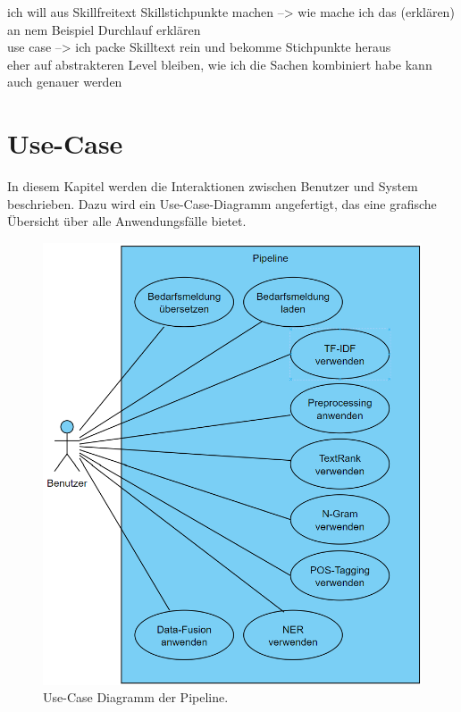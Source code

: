 ich will aus Skillfreitext Skillstichpunkte machen --> wie mache ich das (erklären)\\

an nem Beispiel Durchlauf erklären\\

use case --> ich packe Skilltext rein und bekomme Stichpunkte heraus\\

eher auf abstrakteren Level bleiben, wie ich die Sachen kombiniert habe kann auch genauer werden\\

\newpage
\section{Use-Case}
\label{sec:usecase}
In diesem Kapitel werden die Interaktionen zwischen Benutzer und System beschrieben. Dazu wird ein Use-Case-Diagramm angefertigt, das eine grafische Übersicht über alle Anwendungsfälle bietet.
\begin{figure}[H]
	\centering  
	\includegraphics[width=\linewidth]{Abbildungen/use-case.png}
	\caption{Use-Case Diagramm der Pipeline.}
	\label{fig:usecasediagrammwirklich}
\end{figure}\mbox{} \\

